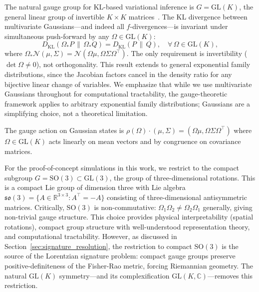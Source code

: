 \documentclass[11pt]{article}
\begin{document}
The natural gauge group for KL-based variational inference is $G = \mathrm{GL}(K)$, the general linear group of invertible $K \times K$ matrices~\cite{Dennis2026GL}. The KL divergence between multivariate Gaussians---and indeed all $f$-divergences---is invariant under simultaneous push-forward by any $\Omega \in \mathrm{GL}(K)$:
\begin{equation}
D_{\mathrm{KL}}(\Omega_* P \,\|\, \Omega_* Q) = D_{\mathrm{KL}}(P \,\|\, Q), \quad \forall\, \Omega \in \mathrm{GL}(K),
\label{eq:glk_invariance}
\end{equation}
where $\Omega_* \mathcal{N}(\mu, \Sigma) = \mathcal{N}(\Omega\mu, \Omega\Sigma\Omega^\top)$. The only requirement is invertibility ($\det \Omega \neq 0$), not orthogonality. This result extends to general exponential family distributions, since the Jacobian factors cancel in the density ratio for any bijective linear change of variables. We emphasize that while we use multivariate Gaussians throughout for computational tractability, the gauge-theoretic framework applies to arbitrary exponential family distributions; Gaussians are a simplifying choice, not a theoretical limitation.

The gauge action on Gaussian states is $\rho(\Omega) \cdot (\mu, \Sigma) = (\Omega\mu, \Omega\Sigma\Omega^\top)$ where $\Omega \in \mathrm{GL}(K)$ acts linearly on mean vectors and by congruence on covariance matrices.

For the proof-of-concept simulations in this work, we restrict to the compact subgroup $G = \mathrm{SO}(3) \subset \mathrm{GL}(3)$, the group of three-dimensional rotations. This is a compact Lie group of dimension three with Lie algebra $\mathfrak{so}(3) = \{A \in \mathbb{R}^{3 \times 3} : A^\top = -A\}$ consisting of three-dimensional antisymmetric matrices. Critically, $\mathrm{SO}(3)$ is non-commutative: $\Omega_1 \Omega_2 \neq \Omega_2 \Omega_1$ generally, giving non-trivial gauge structure. This choice provides physical interpretability (spatial rotations), compact group structure with well-understood representation theory, and computational tractability. However, as discussed in Section~\ref{sec:signature_resolution}, the restriction to compact $\mathrm{SO}(3)$ is the source of the Lorentzian signature problem: compact gauge groups preserve positive-definiteness of the Fisher-Rao metric, forcing Riemannian geometry. The natural $\mathrm{GL}(K)$ symmetry---and its complexification $\mathrm{GL}(K, \mathbb{C})$---removes this restriction.
\end{document}
